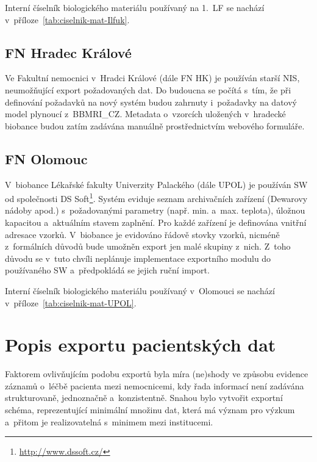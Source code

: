 \documentclass[11pt, draft, oneside]{fithesis2}
\newcommand{\ProjectName}{\mbox{BBMRI\_CZ}\xspace}
\begin{document}
Interní číselník biologického materiálu používaný na 1.~LF se nachází v~příloze~\ref{tab:ciselnik-mat-Ilfuk}.

\subsection{FN Hradec Králové}
Ve Fakultní nemocnici v~Hradci Králové (dále FN HK) je používán starší NIS, neumožňující export požadovaných dat. Do budoucna se počítá s~tím, že při definování požadavků na nový systém budou zahrnuty i~požadavky na datový model plynoucí z~\ProjectName. Metadata o~vzorcích uložených v~hradecké biobance budou zatím zadávána manuálně prostřednictvím webového formuláře.

\subsection{FN Olomouc}
V~biobance Lékařské fakulty Univerzity Palackého (dále UPOL) je používán SW od společnosti DS Soft\footnote{\url{http://www.dssoft.cz/}}. Systém eviduje seznam archivačních zařízení (Dewarovy nádoby apod.) s~požadovanými parametry (např. min. a~max. teplota), úložnou kapacitou a~aktuálním stavem zaplnění. Pro každé zařízení je definována vnitřní adresace vzorků.
V~biobance je evidováno řádově stovky vzorků, nicméně z~formálních důvodů bude umožněn export jen malé skupiny z~nich. Z~toho důvodu se v~tuto chvíli neplánuje implementace exportního modulu do používaného SW a~předpokládá se jejich ruční import.

Interní číselník biologického materiálu používaný v~Olomouci se nachází v~příloze~\ref{tab:ciselnik-mat-UPOL}.


\section{Popis exportu pacientských dat}

Faktorem ovlivňujícím podobu exportů byla míra (ne)shody ve způsobu evidence záznamů o~léčbě pacienta mezi nemocnicemi, kdy řada informací není zadávána strukturovaně, jednoznačně a~konzistentně. Snahou bylo vytvořit exportní schéma, reprezentující minimální množinu dat, která má význam pro výzkum a~přitom je realizovatelná s~minimem  mezi institucemi.
\end{document}
